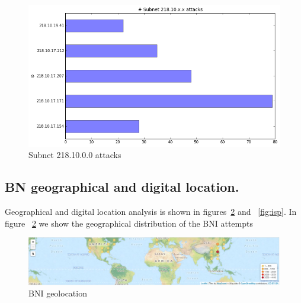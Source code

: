 \begin{figure}[h]
    \caption{Subnet 218.10.0.0 attacks}
    \label{fig:subnet}
    \centering
    \includegraphics[width=0.9\linewidth]{images/subnet}
\end{figure}

\subsection{BN geographical and digital location.}
Geographical and digital location analysis is shown in figures~\ref{fig:map} and ~\ref{fig:isp}. In figure ~\ref{fig:map} we show the geographical distribution of the BNI attempts

\begin{figure}[ht]

\caption{BNI geolocation~\cite{map}}
\label{fig:map}
\centering
    \includegraphics[width=0.9\linewidth]{images/map}
\end{figure}


